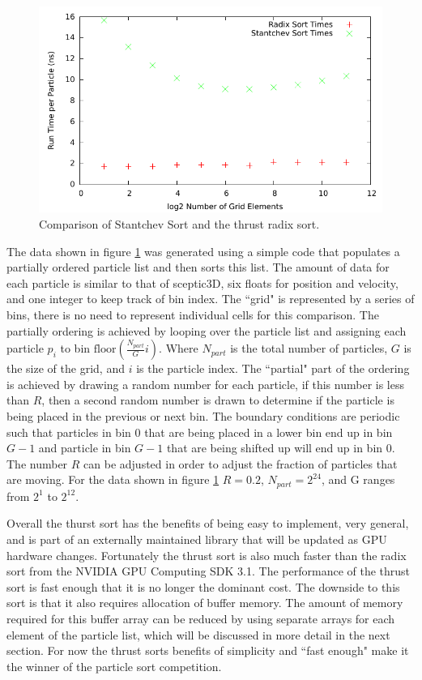 \begin{figure}
\begin{center}
\includegraphics[width=5in]{design/sort_compare.pdf}
\end{center}
\caption{Comparison of Stantchev Sort and the thrust radix sort.}
\label{fig:stantchev_sort_compare}
\end{figure}

The data shown in figure \ref{fig:stantchev_sort_compare} was generated using a simple code that populates a partially ordered particle list and then sorts this list. The amount of data for each particle is similar to that of sceptic3D, six floats for position and velocity, and one integer to keep track of bin index. The ``grid" is represented by a series of bins, there is no need to represent individual cells for this comparison. The partially ordering is achieved by looping over the particle list and assigning each particle $p_i$ to bin $\mathrm{floor}(\frac{N_{part}}{G} i)$. Where $N_{part}$ is the total number of particles, $G$ is the size of the grid, and $i$ is the particle index. The ``partial" part of the ordering is achieved by drawing a random number for each particle, if this number is less than $R$, then a second random number is drawn to determine if the particle is being placed in the previous or next bin. The boundary conditions are periodic such that particles in bin 0 that are being placed in a lower bin end up in bin $G-1$ and particle in bin $G-1$ that are being shifted up will end up in bin 0. The number $R$ can be adjusted in order to adjust the fraction of particles that are moving. For the data shown in figure \ref{fig:stantchev_sort_compare} $R = 0.2$, $N_{part} = 2^{24}$, and G ranges from $2^1$ to $2^{12}$. 

Overall the thurst sort has the benefits of being easy to implement, very general, and is part of an externally maintained library that will be updated as GPU hardware changes. Fortunately the thrust sort is also much faster than the radix sort from the NVIDIA GPU Computing SDK 3.1. The performance of the thrust sort is fast enough that it is no longer the dominant cost. The downside to this sort is that it also requires allocation of buffer memory. The amount of memory required for this buffer array can be reduced by using separate arrays for each element of the particle list, which will be discussed in more detail in the next section. For now the thrust sorts benefits of simplicity and ``fast enough" make it the winner of the particle sort competition. 

